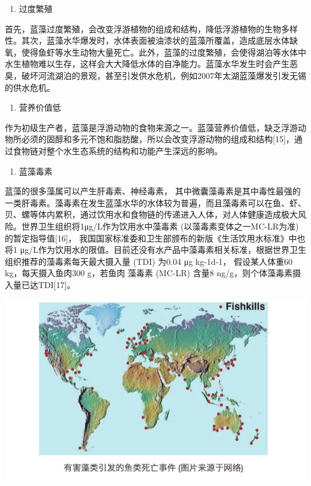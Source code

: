 \documentclass[]{book}
\providecommand{\tightlist}{%
  \setlength{\itemsep}{0pt}\setlength{\parskip}{0pt}}
\begin{document}
\begin{enumerate}
\def\labelenumi{\arabic{enumi}.}
\tightlist
\item
  过度繁殖
\end{enumerate}

首先，蓝藻过度繁殖，会改变浮游植物的组成和结构，降低浮游植物的生物多样性。其次，蓝藻水华爆发时，水体表面被油漆状的蓝藻所覆盖，造成底层水体缺氧，使得鱼虾等水生动物大量死亡。此外，蓝藻的过度繁殖，会使得湖泊等水体中水生植物难以生存，这样会大大降低水体的自净能力。蓝藻水华发生时会产生恶臭，破坏河流湖泊的景观，甚至引发供水危机，例如2007年太湖蓝藻爆发引发无锡的供水危机。

\begin{enumerate}
\def\labelenumi{\arabic{enumi}.}
\setcounter{enumi}{1}
\tightlist
\item
  营养价值低
\end{enumerate}

作为初级生产者，蓝藻是浮游动物的食物来源之一。蓝藻营养价值低，缺乏浮游动物所必须的固醇和多元不饱和脂肪酸，所以会改变浮游动物的组成和结构{[}15{]}，通过食物链对整个水生态系统的结构和功能产生深远的影响。

\begin{enumerate}
\def\labelenumi{\arabic{enumi}.}
\setcounter{enumi}{2}
\tightlist
\item
  蓝藻毒素
\end{enumerate}

蓝藻的很多藻属可以产生肝毒素、神经毒素，
其中微囊藻毒素是其中毒性最强的一类肝毒素。藻毒素在发生蓝藻水华的水体较为普遍，而且藻毒素可以在鱼、虾、贝、螺等体内累积，通过饮用水和食物链的传递进入人体，对人体健康造成极大风险。世界卫生组织将1μg/L作为饮用水中藻毒素
(以藻毒素变体之一MC-LR为准) 的暂定指导值{[}16{]}，
我国国家标准委和卫生部颁布的新版《生活饮用水标准》中也将1
μg/L作为饮用水的限值。目前还没有水产品中藻毒素相关标准，根据世界卫生组织推荐的藻毒素每天最大摄入量
(TDI) 为0.04 μg kg-1d-1， 假设某人体重60 kg，每天摄入鱼肉300 g，若鱼肉
藻毒素 (MC-LR) 含量8 ng/g，则个体藻毒素摄入量已达TDI{[}17{]}。

\includegraphics[width=8.33in]{images/lanzao3}
\end{document}

